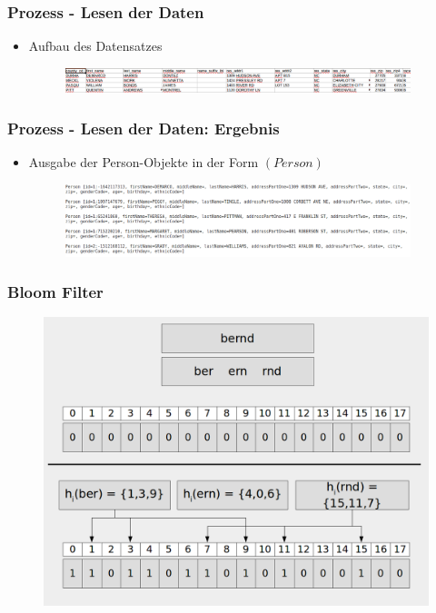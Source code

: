 \documentclass{beamer}
\begin{document}
    \begin{frame}
    		\frametitle{Prozess - Lesen der Daten}
    		\begin{itemize}
    			\item Aufbau des Datensatzes
    			\begin{figure}
    				\includegraphics[width=0.95\textwidth]{graphics/voter_dataset.png}
    			\end{figure}
    		\end{itemize}
    \end{frame}
    
    \begin{frame}
    		\frametitle{Prozess - Lesen der Daten: Ergebnis}
    		\begin{itemize}
    				\item Ausgabe der Person-Objekte in der Form $(Person)$
    				\begin{figure}[H]
    					\includegraphics[width=0.95\textwidth]{graphics/persons.png}
    				\end{figure}
    		\end{itemize}
    \end{frame}
    
    \begin{frame}
    		\frametitle{Bloom Filter}
            \begin{figure}[H]
                \includegraphics[width=\textwidth]{graphics/bloom_qgram.png}
            \end{figure}
    \end{frame}
\end{document}

